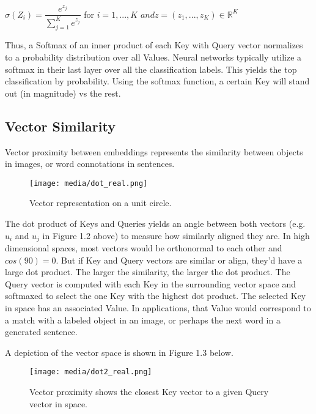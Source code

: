 \begin{center}
	$ \displaystyle\sigma(Z_i) = \dfrac{e^{z_j}}{\sum_{j=1}^K e^{z_j}}$ for $i=1,...,K$ $and z=(z_1,...,z_K) \in \mathbb{R}^K $
	\end{center}

Thus, a Softmax of an inner product of each Key with Query vector normalizes to a 
probability distribution over all Values. Neural networks typically utilize a softmax in their last 
layer over all the classification labels. This yields the top classification by probability. 
Using the softmax function, a certain Key will stand out (in magnitude) vs the rest.


\subsection{Vector Similarity}

Vector proximity between embeddings represents the similarity between objects in images, or 
word connotations in sentences.


\begin{figure}[H]
	\begin{center}
	\texttt{[image: media/dot\_real.png]}
	\end{center}
	\caption[Vector Representation]{Vector representation on a unit circle.}
	\end{figure}


The dot product of Keys and Queries yields an angle between both vectors (e.g. $u_i$ and $u_j$ in Figure 1.2 above) to measure 
how similarly aligned they are. In high dimensional spaces, most vectors would be orthonormal to each other
and $cos(90)=0$. But if Key and Query vectors are similar or align, they'd have a large dot product. 
The larger the similarity, the larger the dot product. 
The Query vector is computed with each Key in the surrounding vector space and softmaxed to 
select the one Key with the highest dot product.
The selected Key in space has an associated Value. In applications, that Value would correspond to 
a match with a labeled object in an image, or perhaps the next word in a generated sentence. 


A depiction of the vector space is shown in Figure 1.3 below.


\begin{figure}[H]
	\begin{center}
	\texttt{[image: media/dot2\_real.png]}
	\end{center}
	\caption[Key/Query Vector Proximity]{Vector proximity shows the closest Key vector to a given Query vector in space.}
	\end{figure}



